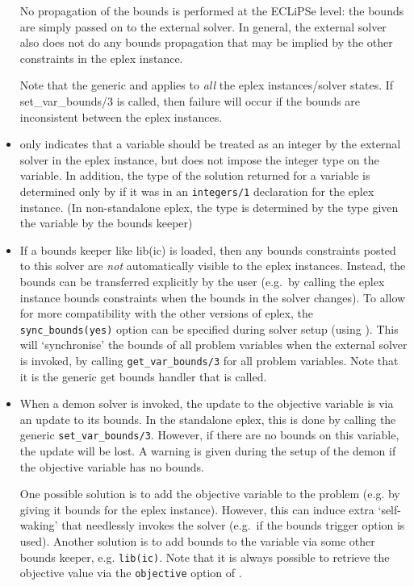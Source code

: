 \begin{sloppypar}
\begin{itemize}
No propagation of the bounds is performed at the ECLiPSe level: the bounds
are simply passed on to the external solver. In general, the external
solver also does not do any bounds propagation that may be implied by the
other constraints in the eplex instance. 

Note that the generic  and 
applies to {\it all} the eplex instances/solver states. If set_var_bounds/3
is called, then failure will occur if the bounds are inconsistent between
the eplex instances.


\item {} only indicates that a
variable should be treated as an integer by the external solver in the
eplex instance, but does not impose the integer type on the variable. 
In addition, the type of the solution returned for a variable is determined
only by if it was in an {\tt integers/1} declaration for the eplex instance.
(In non-standalone eplex, the type is determined by the type given the
variable by the bounds keeper)

\item If a bounds keeper like lib(ic) is loaded, then any bounds
constraints posted to this solver are {\it not\/} automatically visible to
the eplex instances. Instead, the bounds can be transferred explicitly by
the user (e.g.\ by calling the eplex instance bounds constraints when the
bounds in the solver changes). To allow for more compatibility with the
other versions of eplex, the \verb'sync_bounds(yes)' option can be
specified during solver setup (using ). This will `synchronise' the bounds of all problem
variables when the external solver is invoked, by calling
\verb'get_var_bounds/3' for all problem variables. Note that it is the generic
get bounds handler that is called. 

\item When a demon solver is invoked, the update to the objective 
variable is via an update to its bounds. In the standalone eplex, this is
done by calling the generic \verb'set_var_bounds/3'. However, if there are
no bounds on this variable, the update will be lost. A warning is given
during the setup of the demon if the objective variable has no bounds. 

One possible solution is to add the objective variable to the problem
(e.g. by giving it bounds for the eplex instance). However, this can induce
extra `self-waking' that needlessly invokes the solver (e.g.\ if the bounds
trigger option is used). Another solution is to add bounds to the variable
via some other bounds keeper, e.g. \verb'lib(ic)'. Note that it is always
possible to retrieve the objective value via the \verb'objective' option of
.


\end{itemize}
\end{sloppypar}
